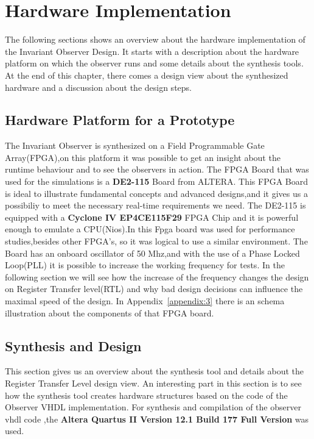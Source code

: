 \chapter{Hardware Implementation}

\ifpdf
    \graphicspath{{Chapter3/Figs/Raster/}{Chapter3/Figs/PDF/}{Chapter3/Figs/}}
\else
    \graphicspath{{Chapter3/Figs/Vector/}{Chapter3/Figs/}}
\fi


The following sections shows an overview about the hardware implementation of the Invariant Observer Design.
It starts with a description about the hardware platform on which the observer runs and some details
about the synthesis tools.
At the end of this chapter, there comes a design view about the synthesized hardware and a discussion about 
the design steps.
\section{Hardware Platform for a Prototype}
The Invariant Observer is synthesized on a Field Programmable Gate Array(FPGA),on this platform it was possible to get an insight
about the runtime behaviour and to see the observers in action. 
The FPGA Board that was used for the simulations is a \textbf{DE2-115} Board from ALTERA\cite{altera1}.
This FPGA Board is ideal to illustrate fundamental concepts and advanced designs,and it gives us a possibiliy
to meet the necessary real-time requirements we need. The DE2-115 is equipped with a \textbf{Cyclone IV EP4CE115F29} 
FPGA Chip and it is powerful enough to emulate a CPU(Nios).In \cite{RTFMBJ13} this Fpga board was used for performance studies,besides other FPGA's,
so it was logical to use a similar environment.
The Board has an onboard oscillator of 50 Mhz,and with the use of a Phase Locked Loop(PLL) it is possible to increase the working frequency for tests.
In the following section we will see how the increase of the frequency changes the design on Register Transfer level(RTL) and why bad design decisions 
can influence the maximal speed of the design. In Appendix~\ref{appendix:3} there is an schema illustration about the components of that FPGA board.


\section{Synthesis and Design}
This section gives us an overview about the synthesis tool and details about the Register Transfer Level design view.
An interesting part in this section is to see how the synthesis tool creates hardware structures based on the code of the
Observer VHDL implementation.\newline
For synthesis and compilation of the observer vhdl code ,the \textbf{Altera Quartus II Version 12.1 Build 177 Full Version} was used.
